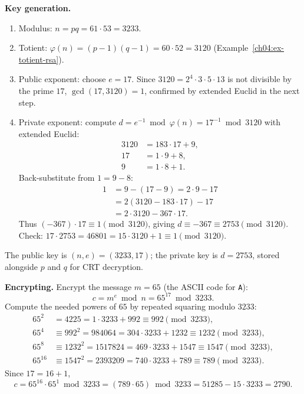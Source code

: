 \textbf{Key generation.}
\begin{enumerate}
\item Modulus: $n = pq = 61 \cdot 53 = 3233$.
\item Totient: $\varphi(n) = (p-1)(q-1) = 60 \cdot 52 = 3120$
      (Example~\ref{ch04:ex-totient-rsa}).
\item Public exponent: choose $e = 17$. Since $3120 = 2^4 \cdot 3 \cdot 5 \cdot 13$ is not divisible
      by the prime $17$, $\gcd(17, 3120) = 1$, confirmed by extended Euclid in the next step.
\item Private exponent: compute $d = e^{-1} \bmod \varphi(n) = 17^{-1} \bmod 3120$ with extended
      Euclid:
      \begin{align*}
      3120 &= 183 \cdot 17 + 9, \\
        17 &= 1 \cdot 9 + 8, \\
         9 &= 1 \cdot 8 + 1.
      \end{align*}
      Back-substitute from $1 = 9 - 8$:
      \begin{align*}
      1 &= 9 - (17 - 9) = 2 \cdot 9 - 17 \\
        &= 2(3120 - 183 \cdot 17) - 17 \\
        &= 2 \cdot 3120 - 367 \cdot 17.
      \end{align*}
      Thus $(-367) \cdot 17 \equiv 1 \pmod{3120}$, giving
      $d \equiv -367 \equiv 2753 \pmod{3120}$. Check:
      $17 \cdot 2753 = 46801 = 15 \cdot 3120 + 1 \equiv 1 \pmod{3120}$.
\end{enumerate}
The public key is $(n, e) = (3233, 17)$; the private key is $d = 2753$, stored alongside $p$ and $q$
for CRT decryption.

\textbf{Encrypting.} Encrypt the message $m = 65$ (the ASCII code for \texttt{A}):
\[
  c = m^e \bmod n = 65^{17} \bmod 3233.
\]
Compute the needed powers of $65$ by repeated squaring modulo $3233$:
\begin{align*}
  65^2 &= 4225 = 1 \cdot 3233 + 992 \equiv 992 \pmod{3233}, \\
  65^4 &\equiv 992^2 = 984064 = 304 \cdot 3233 + 1232 \equiv 1232 \pmod{3233}, \\
  65^8 &\equiv 1232^2 = 1517824 = 469 \cdot 3233 + 1547 \equiv 1547 \pmod{3233}, \\
  65^{16} &\equiv 1547^2 = 2393209 = 740 \cdot 3233 + 789 \equiv 789 \pmod{3233}.
\end{align*}
Since $17 = 16 + 1$,
\[
  c = 65^{16} \cdot 65^1 \bmod 3233 = (789 \cdot 65) \bmod 3233 = 51285 - 15 \cdot 3233 = 2790.
\]

